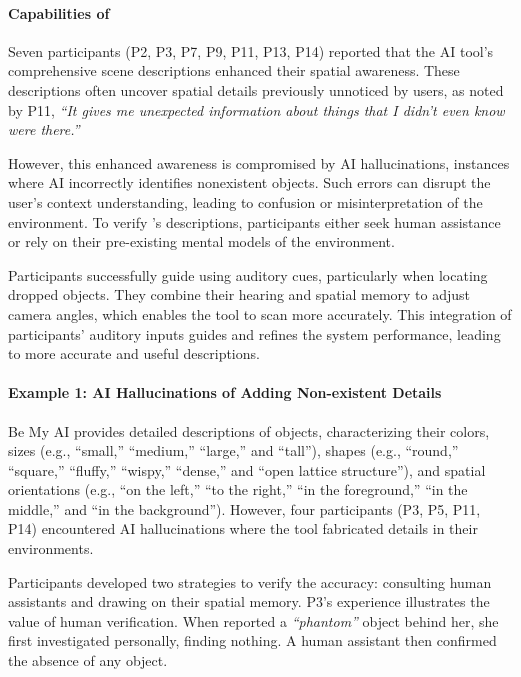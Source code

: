 \paragraph{Capabilities of \bma} Seven participants (P2, P3, P7, P9, P11, P13, P14) reported that the AI tool's comprehensive scene descriptions enhanced their spatial awareness. 
These descriptions often uncover spatial details previously unnoticed by users, as noted by P11, \textit{``It gives me unexpected information about things that I didn't even know were there.''} 
% 


However, this enhanced awareness is compromised by AI hallucinations, instances where AI incorrectly identifies nonexistent objects. 
Such errors can disrupt the user's context understanding, leading to confusion or misinterpretation of the environment. To verify \sbma's descriptions, participants either seek human assistance or rely on their pre-existing mental models of the environment. 



Participants successfully guide \sbma{} using auditory cues, particularly when locating dropped objects. They combine their hearing and spatial memory to adjust camera angles, which enables the tool to scan more accurately. 
% 
This integration of participants' auditory inputs guides and refines the system performance, leading to more accurate and useful descriptions.




\paragraph{Example 1: AI Hallucinations of Adding Non-existent Details}


Be My AI provides detailed descriptions of objects, characterizing their colors, sizes (e.g., ``small,'' ``medium,'' ``large,'' and ``tall''), shapes (e.g., ``round,'' ``square,'' ``fluffy,'' ``wispy,'' ``dense,'' and ``open lattice structure''), and spatial orientations (e.g., ``on the left,'' ``to the right,'' ``in the foreground,'' ``in the middle,'' and ``in the background''). 
% 
However, four participants (P3, P5, P11, P14) encountered AI hallucinations where the tool fabricated details in their environments. 



Participants developed two strategies to verify the accuracy: consulting human assistants and drawing on their spatial memory.
P3's experience illustrates the value of human verification. When \bma{} reported a \textit{``phantom''} object behind her, she first investigated personally, finding nothing. A human assistant then confirmed the absence of any object. 

